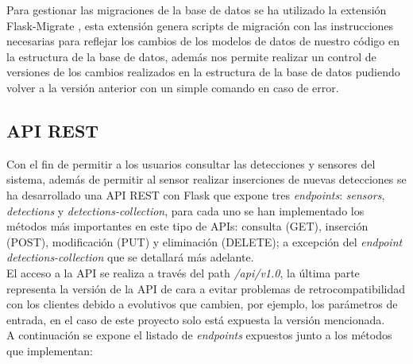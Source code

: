 \documentclass[../proyecto.tex]{subfiles}
\begin{document}
Para gestionar las migraciones de la base de datos se ha utilizado la extensión Flask-Migrate \cite{flask_migrate}, esta extensión genera scripts de migración con las instrucciones necesarias para reflejar los cambios de los modelos de datos de nuestro código en la estructura de la base de datos, además nos permite realizar un control de versiones de los cambios realizados en la estructura de la base de datos pudiendo volver a la versión anterior con un simple comando en caso de error.\\

\subsection{API REST}
Con el fin de permitir a los usuarios consultar las detecciones y sensores del sistema, además de permitir al sensor realizar inserciones de nuevas detecciones se ha desarrollado una API REST con Flask que expone tres \textit{endpoints}: \textit{sensors}, \textit{detections} y \textit{detections-collection}, para cada uno se han implementado los métodos más importantes en este tipo de APIs: consulta (GET), inserción (POST), modificación (PUT) y eliminación (DELETE); a excepción del \textit{endpoint detections-collection} que se detallará más adelante.\\

El acceso a la API se realiza a través del path \textit{/api/v1.0}, la última parte representa la versión de la API de cara a evitar problemas de retrocompatibilidad con los clientes debido a evolutivos que cambien, por ejemplo, los parámetros de entrada, en el caso de este proyecto solo está expuesta la versión mencionada.\\

A continuación se expone el listado de \textit{endpoints} expuestos junto a los métodos que implementan:\\
\end{document}

